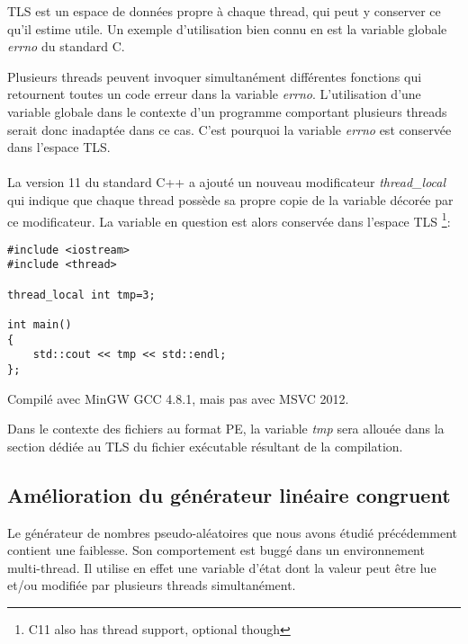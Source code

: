 ﻿
\label{TLS}

TLS est un espace de données propre à chaque thread, qui peut y conserver ce qu'il estime utile.
Un exemple d'utilisation bien connu en est la variable globale \emph{errno} du standard C.

Plusieurs threads peuvent invoquer simultanément différentes fonctions qui retournent toutes un code 
erreur dans la variable \emph{errno}. L'utilisation d'une variable globale dans le contexte d'un 
programme comportant plusieurs threads serait donc inadaptée dans ce cas. C'est pourquoi la variable 
\emph{errno} est conservée dans l'espace \ac{TLS}.\\
\\
La version 11 du standard C++ a ajouté un nouveau modificateur \emph{thread\_local} qui indique que 
chaque thread possède sa propre copie de la variable décorée par ce modificateur. La variable en 
question est alors conservée dans l'espace \ac{TLS}
\footnote{ C11 also has thread support, optional though}:

\begin{lstlisting}[caption=C++11,style=customc]
#include <iostream>
#include <thread>

thread_local int tmp=3;

int main()
{
	std::cout << tmp << std::endl;
};
\end{lstlisting}

Compilé avec MinGW GCC 4.8.1, mais pas avec MSVC 2012.

Dans le contexte des fichiers au format PE, la variable \emph{tmp} sera allouée dans la section dédiée 
au \ac{TLS} du fichier exécutable résultant de la compilation.

\subsection{Amélioration du générateur linéaire congruent}
\label{LCG_TLS}

Le générateur de nombres pseudo-aléatoires  que nous avons étudié précédemment 
contient une faiblesse. Son comportement est buggé dans un environnement multi-thread. Il utilise 
en effet une variable d'état dont la valeur peut être lue et/ou modifiée par plusieurs threads 
simultanément.




